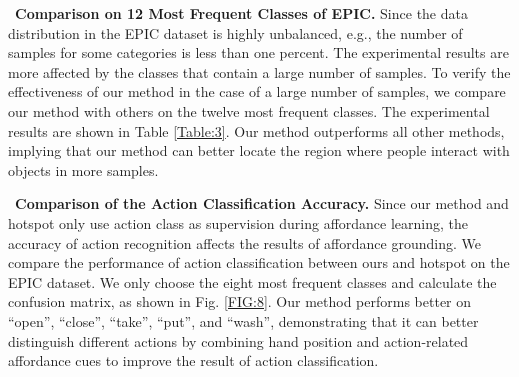 \documentclass[journal,twoside]{IEEEtran}
\newcommand{\myPara}[1]{\vspace{5pt}\noindent~\textbf{#1} \quad}
\begin{document}
\myPara{Comparison on 12 Most Frequent Classes of EPIC.}
Since the data distribution in the EPIC \cite{Damen2018EPICKITCHENS} dataset is highly unbalanced, e.g., the number of samples for some categories is less than one percent. The experimental results are more affected by the classes that contain a large number of samples. To verify the effectiveness of our method in the case of a large number of samples, we compare our method with others on the twelve most frequent classes. The experimental results are shown in Table \ref{Table:3}. Our method outperforms all other methods, implying that our method can better locate the region where people interact with objects in more samples.

\myPara{Comparison of the Action Classification Accuracy.}
Since our method and hotspot \cite{interaction-hotspots} only use action class as supervision during affordance learning, the accuracy of action recognition affects the results of affordance grounding. We compare the performance of action classification between ours and hotspot \cite{interaction-hotspots} on the EPIC \cite{Damen2018EPICKITCHENS} dataset. We only choose the eight most frequent classes and calculate the confusion matrix, as shown in Fig. \ref{FIG:8}. Our method performs better on ``open'', ``close'', ``take'', ``put'', and ``wash'', demonstrating that it can better distinguish different actions by combining hand position and action-related affordance cues to improve the result of action classification.
\end{document}
